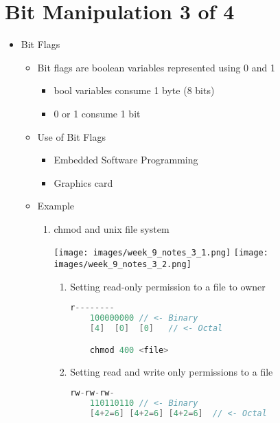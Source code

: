 \documentclass[12pt]{article}
\begin{document}
\bigskip

\section*{Bit Manipulation 3 of 4}

\bigskip

\begin{itemize}
    \item Bit Flags
    \begin{itemize}
        \item Bit flags are boolean variables represented using 0 and 1
        \begin{itemize}
            \item bool variables consume 1 byte (8 bits)
            \item 0 or 1 consume 1 bit
        \end{itemize}
        \item Use of Bit Flags
        \begin{itemize}
            \item Embedded Software Programming
            \item Graphics card
        \end{itemize}
        \item Example
        \begin{enumerate}[1.]
            \item chmod and unix file system

            \begin{center}
            \texttt{[image: images/week\_9\_notes\_3\_1.png]}
            \texttt{[image: images/week\_9\_notes\_3\_2.png]}
            \end{center}

            \bigskip

            \begin{enumerate}[1.]
                \item Setting read-only permission to a file to owner
    \begin{lstlisting}[language=c]
    r--------
    100000000 // <- Binary
    [4]  [0]  [0]   // <- Octal

    chmod 400 <file>
    \end{lstlisting}
            \item Setting read and write only permissions to a file
    \begin{lstlisting}[language=c]
    rw-rw-rw-
    110110110 // <- Binary
    [4+2=6] [4+2=6] [4+2=6]  // <- Octal


\end{lstlisting}
\end{enumerate}
\end{enumerate}
\end{itemize}
\end{itemize}
\end{document}

